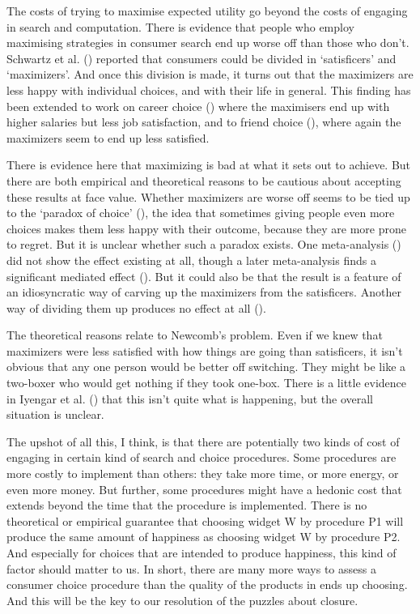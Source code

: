 \documentclass[
  12pt,
  letterpaper,
]{scrbook}
\begin{document}
The costs of trying to maximise expected utility go beyond the costs of
engaging in search and computation. There is evidence that people who
employ maximising strategies in consumer search end up worse off than
those who don't. Schwartz et al. ()
reported that consumers could be divided in `satisficers' and
`maximizers'. And once this division is made, it turns out that the
maximizers are less happy with individual choices, and with their life
in general. This finding has been extended to work on career choice
()
where the maximisers end up with higher salaries but less job
satisfaction, and to friend choice
(), where again the maximizers seem to end up less satisfied.

There is evidence here that maximizing is bad at what it sets out to
achieve. But there are both empirical and theoretical reasons to be
cautious about accepting these results at face value. Whether maximizers
are worse off seems to be tied up to the `paradox of choice'
(), the idea that sometimes
giving people even more choices makes them less happy with their
outcome, because they are more prone to regret. But it is unclear
whether such a paradox exists. One meta-analysis
() did not show the effect existing at all, though a later
meta-analysis finds a significant mediated effect
().
But it could also be that the result is a feature of an idiosyncratic
way of carving up the maximizers from the satisficers. Another way of
dividing them up produces no effect at all
().

The theoretical reasons relate to Newcomb's problem. Even if we knew
that maximizers were less satisfied with how things are going than
satisficers, it isn't obvious that any one person would be better off
switching. They might be like a two-boxer who would get nothing if they
took one-box. There is a little evidence in Iyengar et al.
() that this isn't quite what is
happening, but the overall situation is unclear.

The upshot of all this, I think, is that there are potentially two kinds
of cost of engaging in certain kind of search and choice procedures.
Some procedures are more costly to implement than others: they take more
time, or more energy, or even more money. But further, some procedures
might have a hedonic cost that extends beyond the time that the
procedure is implemented. There is no theoretical or empirical guarantee
that choosing widget W by procedure P1 will produce the same amount of
happiness as choosing widget W by procedure P2. And especially for
choices that are intended to produce happiness, this kind of factor
should matter to us. In short, there are many more ways to assess a
consumer choice procedure than the quality of the products in ends up
choosing. And this will be the key to our resolution of the puzzles
about closure.
\end{document}
